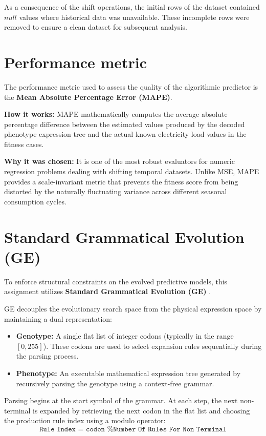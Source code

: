 \documentclass[12pt]{article}
\begin{document}
    As a consequence of the shift operations, the initial rows of the dataset contained $null$ values where historical data was unavailable. These incomplete rows were removed to ensure a clean dataset for subsequent analysis.

\section{Performance metric}
    The performance metric used to assess the quality of the algorithmic predictor is the \textbf{Mean Absolute Percentage Error (MAPE)}.
    
    \textbf{How it works:} MAPE mathematically computes the average absolute percentage difference between the estimated values produced by the decoded phenotype expression tree and the actual known electricity load values in the fitness cases.
    
    \textbf{Why it was chosen:} It is one of the most robust evaluators for numeric regression problems dealing with shifting temporal datasets. Unlike MSE, MAPE provides a scale-invariant metric that prevents the fitness score from being distorted by the naturally fluctuating variance across different seasonal consumption cycles.

\section{Standard Grammatical Evolution (GE)}

    To enforce structural constraints on the evolved predictive models, this assignment utilizes \textbf{Standard Grammatical Evolution (GE)} \cite{oneill2001}.

    GE decouples the evolutionary search space from the physical expression space by maintaining a dual representation:
    \begin{itemize}
        \item \textbf{Genotype:} A single flat list of integer codons (typically in the range $[0, 255]$). These codons are used to select expansion rules sequentially during the parsing process.
        \item \textbf{Phenotype:} An executable mathematical expression tree generated by recursively parsing the genotype using a context-free grammar.
    \end{itemize}
    
    Parsing begins at the start symbol of the grammar. At each step, the next non-terminal is expanded by retrieving the next codon in the flat list and choosing the production rule index using a modulo operator: 
    \begin{equation}
        \texttt{Rule Index = codon \% Number Of Rules For Non Terminal}
    \end{equation}
    
\end{document}

